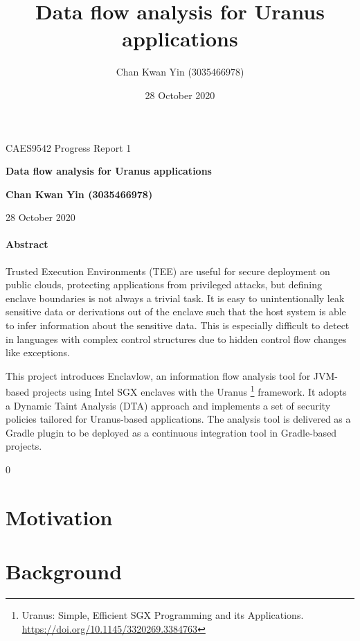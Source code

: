 \documentclass[a4paper, 12pt]{article}
\title{Data flow analysis for Uranus applications}
\author{Chan Kwan Yin (3035466978)}
\date{28 October 2020}
\begin{document}
\begin{titlepage}
	\begin{center}
		\vspace*{2em}
		\LARGE
		CAES9542 Progress Report 1

		\vspace*{1em}
		\Huge
		\textbf{Data flow analysis for Uranus applications}

		\Large
		\vspace{1.5em}
		\textbf{Chan Kwan Yin (3035466978)}

		\vspace{0.5em}
		28 October 2020
	\end{center}

	\vfill
	\paragraph{Abstract}
	Trusted Execution Environments (TEE) are useful for secure deployment on public clouds,
	protecting applications from privileged attacks,
	but defining enclave boundaries is not always a trivial task.
	It is easy to unintentionally leak sensitive data or derivations out of the enclave
	such that the host system is able to infer information about the sensitive data.
	This is especially difficult to detect in languages with complex control structures
	due to hidden control flow changes like exceptions.

	This project introduces Enclavlow, an information flow analysis tool
	for JVM-based projects using Intel SGX enclaves with the Uranus \footnote{
		Uranus: Simple, Efficient SGX Programming and its Applications.
		\url{https://doi.org/10.1145/3320269.3384763}
	} framework.
	It adopts a Dynamic Taint Analysis (DTA) approach
	and implements a set of security policies tailored for Uranus-based applications.
	The analysis tool is delivered as a Gradle plugin
	to be deployed as a continuous integration tool in Gradle-based projects.
\end{titlepage}

\thispagestyle{empty}
\tableofcontents
\listoffigures
\listoftables
\lstlistoflistings

\setcounter{page}0
\newpage
\setlength\parskip{1.5em}

\section{Motivation}

\section{Background}
\end{document}
